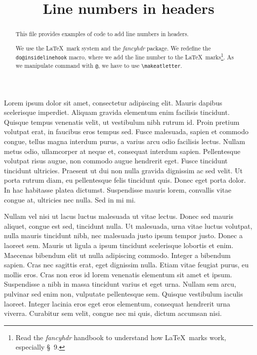 \documentclass[]{article}
\begin{document}
\begin{english}
\title{Line numbers in headers}
\maketitle
\begin{abstract}
This file provides examples of code to add line numbers in headers.

We use the \LaTeX\ mark system and the \emph{fancyhdr} package.
We redefine the \verb+do@insidelinehook+ macro, where we add the line number to the \LaTeX\ marks\footnote{Read the \emph{fancyhdr} handbook to understand how \LaTeX\ marks work, especially §~9.}. As we manipulate command with \verb+@+, we have to use \verb+\makeatletter+.

\end{abstract}
\end{english}


\beginnumbering
\autopar

Lorem ipsum dolor sit amet, consectetur adipiscing elit. Mauris dapibus scelerisque imperdiet. Aliquam gravida elementum enim facilisis tincidunt. Quisque tempus venenatis velit, ut vestibulum nibh rutrum id. Proin pretium volutpat erat, in faucibus eros tempus sed. Fusce malesuada, sapien et commodo congue, tellus magna interdum purus, a varius arcu odio facilisis lectus. Nullam metus odio, ullamcorper at neque et, consequat interdum sapien. Pellentesque volutpat risus augue, non commodo augue hendrerit eget. Fusce tincidunt tincidunt ultricies. Praesent ut dui non nulla gravida dignissim ac sed velit. Ut porta rutrum diam, eu pellentesque felis tincidunt quis. Donec eget porta dolor. In hac habitasse platea dictumst. Suspendisse mauris lorem, convallis vitae congue at, ultricies nec nulla. Sed in mi mi.

Nullam vel nisi ut lacus luctus malesuada ut vitae lectus. Donec sed mauris aliquet, congue est sed, tincidunt nulla. Ut malesuada, urna vitae luctus volutpat, nulla mauris tincidunt nibh, nec malesuada justo ipsum tempor justo. Donec a laoreet sem. Mauris ut ligula a ipsum tincidunt scelerisque lobortis et enim. Maecenas bibendum elit ut nulla adipiscing commodo. Integer a bibendum sapien. Cras nec sagittis erat, eget dignissim nulla. Etiam vitae feugiat purus, eu mollis eros. Cras non eros id lorem venenatis elementum sit amet et ipsum. Suspendisse a nibh in massa tincidunt varius et eget urna. Nullam sem arcu, pulvinar sed enim non, vulputate pellentesque sem. Quisque vestibulum iaculis laoreet. Integer lacinia eros eget eros elementum, consequat hendrerit urna viverra. Curabitur sem velit, congue nec mi quis, dictum accumsan nisi.
\end{document}
